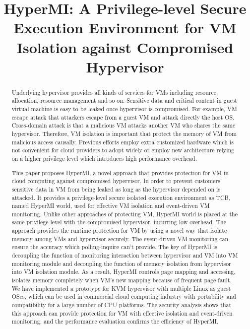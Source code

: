 \documentclass[conference]{IEEEtran}
\begin{document}
\title{HyperMI: A Privilege-level Secure Execution Environment for VM Isolation against Compromised Hypervisor}
\author{


}

\maketitle

\begin{abstract}

Underlying hypervisor provides all kinds of services for VMs including resource allocation, resource management and so on. Sensitive data and critical content in guest virtual machine is easy to be leaked once hypervisor is compromised. For example, VM escape attack that attackers escape from a guest VM and attack directly the host OS. Cross-domain attack is that a malicious VM attacks another VM who shares the same hypervisor. Therefore, VM isolation is important that protect the memory of VM from malicious access causally. Previous efforts employ extra customized hardware which is not convenient for cloud providers to adopt widely or employ new architecture relying on a higher privilege level which introduces high performance overhead.


This paper proposes HyperMI, a novel approach that provides protection for VM in cloud computing against compromised hypervisor. In order to prevent customers' sensitive data in VM from being leaked as long as the hypervisor depended on is attacked. It provides a privilege-level secure isolated execution environment as TCB, named HyperMI world, used for effective VM isolation and event-driven VM monitoring. Unlike other approaches of protecting VM, HyperMI world is placed at the same privilege level with the compromised hypervisor, incurring low overhead. The approach provides the runtime protection for VM by using a novel way that isolate memory among VMs and hypervisor securely. The event-driven VM monitoring can ensure the accuracy which polling-inquire can't provide. The key of HyperMI is decoupling the function of monitoring interaction between hypervisor and VM into VM monitoring module and decoupling the function of memory isolation from hypervisor into VM isolation module. As a result, HyperMI controls page mapping and accessing, isolates memory completely when VM's new mapping because of frequent page fault. We have implemented a prototype for KVM hypervisor with multiple Linux as guest OSes, which can be used in commercial cloud computing industry with portability and compatibility for a large number of CPU platforms. The security analysis shows that this approach can provide protection for VM with effective isolation and event-driven monitoring, and the performance evaluation confirms the efficiency of HyperMI.


\end{abstract}
\end{document}
